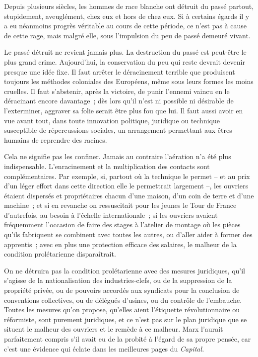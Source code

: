 \documentclass[french,twoside]{book} %
\begin{document}
Depuis plusieurs siècles, les hommes de race blanche ont détruit du passé partout, stupidement, aveuglément, chez eux et hors de chez eux. Si à certains égards il y a eu néanmoins progrès véritable au cours de cette période, ce n'est pas à cause de cette rage, mais malgré elle, sous l'impulsion du peu de passé demeuré vivant.\par
Le passé détruit ne revient jamais plus. La destruction du passé est peut-être le plus grand crime. Aujourd'hui, la conservation du peu qui reste devrait devenir presque une idée fixe. Il faut arrêter le déracinement terrible que produisent toujours les méthodes coloniales des Européens, même sous leurs formes les moins cruelles. Il faut s'abstenir, après la victoire, de punir l'ennemi vaincu en le déracinant encore davantage ; dès lors qu'il n'est ni possible ni désirable de l'exterminer, aggraver sa folie serait être plus fou que lui. Il faut aussi avoir en vue avant tout, dans toute innovation politique, juridique ou technique susceptible de répercussions sociales, un arrangement permettant aux êtres humains de reprendre des racines.\par
Cela ne signifie pas les confiner. Jamais au contraire l'aération n'a été plus indispensable. L'enracinement et la multiplication des contacts sont complémentaires. Par exemple, si, partout où la technique le permet – et au prix d'un léger effort dans cette direction elle le permettrait largement –, les ouvriers étaient dispersés et propriétaires chacun d'une maison, d'un coin de terre et d'une machine ; et si en revanche on ressuscitait pour les jeunes le Tour de France d'autrefois, au besoin à l'échelle internationale ; si les ouvriers avaient fréquemment l'occasion de faire des stages à l'atelier de montage où les pièces qu'ils fabriquent se combinent avec toutes les autres, ou d'aller aider à former des apprentis ; avec en plus une protection efficace des salaires, le malheur de la condition prolétarienne disparaîtrait.\par
On ne détruira pas la condition prolétarienne avec des mesures juridiques, qu'il s'agisse de la nationalisation des industries-clefs, ou de la suppression de la propriété privée, ou de pouvoirs accordés aux syndicats pour la conclusion de conventions collectives, ou de délégués d'usines, ou du contrôle de l'embauche. Toutes les mesures qu'on propose, qu'elles aient l'étiquette révolutionnaire ou réformiste, sont purement juridiques, et ce n'est pas sur le plan juridique que se situent le malheur des ouvriers et le remède à ce malheur. Marx l'aurait parfaitement compris s'il avait eu de la probité à l'égard de sa propre pensée, car c'est une évidence qui éclate dans les meilleures pages du {\itshape Capital.}\par
\end{document}
